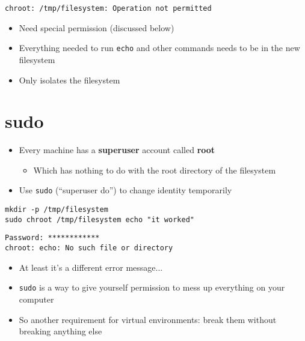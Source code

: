 \documentclass[krantzl]{krantz}
\newcommand{\glossref}[1]{\textbf{#1}}
\begin{document}
\begin{lstlisting}[frame=tblr,backgroundcolor=\color{black!5}]
chroot: /tmp/filesystem: Operation not permitted
\end{lstlisting}

\begin{itemize}
\item Need special permission (discussed below)

\item Everything needed to run \texttt{echo} and other commands needs to be in the new filesystem

\item Only isolates the filesystem

\end{itemize}
\section{sudo}
\begin{itemize}
\item Every machine has a \glossref{superuser} account called \glossref{root}\begin{itemize}
\item Which has nothing to do with the root directory of the filesystem

\end{itemize}


\item Use \texttt{sudo} (“superuser do”) to change identity temporarily

\end{itemize}
\begin{lstlisting}[frame=tblr]
mkdir -p /tmp/filesystem
sudo chroot /tmp/filesystem echo "it worked"
\end{lstlisting}

\begin{lstlisting}[frame=tblr,backgroundcolor=\color{black!5}]
Password: ************
chroot: echo: No such file or directory
\end{lstlisting}

\begin{itemize}
\item At least it’s a different error message...

\item \texttt{sudo} is a way to give yourself permission to mess up everything on your computer

\item So another requirement for virtual environments:
    break them without breaking anything else

\end{itemize}
\end{document}
